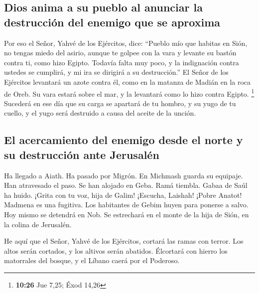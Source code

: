 \begin{paracol}{2}
\hypertarget{dios-anima-a-su-pueblo-al-anunciar-la-destrucciuxf3n-del-enemigo-que-se-aproxima}{%
\subsection{Dios anima a su pueblo al anunciar la destrucción del
enemigo que se
aproxima}\label{dios-anima-a-su-pueblo-al-anunciar-la-destrucciuxf3n-del-enemigo-que-se-aproxima}}

 Por eso el Señor, Yahvé de los Ejércitos, dice: ``Pueblo
mío que habitas en Sión, no tengas miedo del asirio, aunque te golpee
con la vara y levante su bastón contra ti, como hizo Egipto.
 Todavía falta muy poco, y la indignación contra ustedes
se cumplirá, y mi ira se dirigirá a su destrucción.''  El
Señor de los Ejércitos levantará un azote contra él, como en la matanza
de Madián en la roca de Oreb. Su vara estará sobre el mar, y la
levantará como lo hizo contra Egipto. \footnote{\textbf{10:26} Jue 7,25;
  Éxod 14,26}  Sucederá en ese día que su carga se
apartará de tu hombro, y su yugo de tu cuello, y el yugo será destruido
a causa del aceite de la unción.

\hypertarget{el-acercamiento-del-enemigo-desde-el-norte-y-su-destrucciuxf3n-ante-jerusaluxe9n}{%
\subsection{El acercamiento del enemigo desde el norte y su destrucción
ante
Jerusalén}\label{el-acercamiento-del-enemigo-desde-el-norte-y-su-destrucciuxf3n-ante-jerusaluxe9n}}

 Ha llegado a Aiath. Ha pasado por Migrón. En Michmash
guarda su equipaje.  Han atravesado el paso. Se han
alojado en Geba. Ramá tiembla. Gabaa de Saúl ha huido. 
¡Grita con tu voz, hija de Galim! ¡Escucha, Laishah! ¡Pobre Anatot!
 Madmena es una fugitiva. Los habitantes de Gebim huyen
para ponerse a salvo.  Hoy mismo se detendrá en Nob. Se
estrechará en el monte de la hija de Sión, en la colina de Jerusalén.

 He aquí que el Señor, Yahvé de los Ejércitos, cortará
las ramas con terror. Los altos serán cortados, y los altivos serán
abatidos.  Élcortará con hierro los matorrales del
bosque, y el Líbano caerá por el Poderoso.

\switchcolumn
\begin{otherlanguage}{english}


\end{otherlanguage}
\end{paracol}
